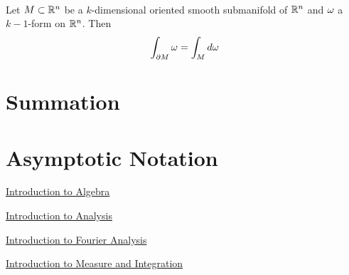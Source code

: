 \documentclass{book}
\begin{document}
	\begin{thm}\\
		Let $M \subset \mathbb{R}^n$ be a $k$-dimensional oriented smooth submanifold of $\mathbb{R}^n$ and $\omega$ a $k-1$-form on $\mathbb{R}^n$. Then $$\int_{\partial M} \omega = \int_M d \omega$$
	\end{thm}



	

\appendix

\chapter{Summation}


\newpage	

\chapter{Asymptotic Notation}








\backmatter
\begin{thebibliography}{4}
	 \href{https://github.com/carsonaj/Mathematics/blob/master/Introduction\%20to\%20Algebra/Introduction\%20to\%20Algebra.pdf}{Introduction to Algebra}
	
	  \href{https://github.com/carsonaj/Mathematics/blob/master/Introduction\%20to\%20Analysis/Introduction\%20to\%20Analysis.pdf}{Introduction to Analysis}	
	
	  \href{https://github.com/carsonaj/Mathematics/blob/master/Introduction\%20to\%20Fourier\%20Analysis/Introduction\%20to\%20Fourier\%20Analysis.pdf}{Introduction to Fourier Analysis}
	
	  \href{https://github.com/carsonaj/Mathematics/blob/master/Introduction\%20to\%20Measure\%20and\%20Integration/Introduction\%20to\%20Measure\%20and\%20Integration.pdf}{Introduction to Measure and Integration}
	
	
	
\end{thebibliography}
\end{document}
